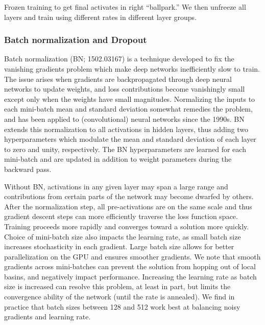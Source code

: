 \documentclass[fleqn,usenatbib]{mnras}
\begin{document}
Frozen training to get final activates in right ``ballpark.''
We then unfreeze all layers and train using different rates in different layer groups.

\subsubsection{Batch normalization and Dropout}

Batch normalization (BN; 1502.03167) is a technique developed to fix the vanishing gradients problem which make deep networks inefficiently slow to train.
The issue arises when gradients are backpropagated through deep neural networks to update weights, and loss contributions become vanishingly small except only when the weights have small magnitudes.
Normalizing the inputs to each mini-batch mean and standard deviation somewhat remedies the problem, and has been applied to (convolutional) neural networks since the 1990s.
BN extends this normalization to all activations in hidden layers, thus adding two hyperparameters which modulate the mean and standard deviation of each layer to zero and unity, respectively.
The BN hyperparameters are learned for each mini-batch and are updated in addition to weight parameters during the backward pass.

Without BN, activations in any given layer may span a large range and contributions from certain parts of the network may become dwarfed by others.
After the normalization step, all pre-activations are on the same scale and thus gradient descent steps can more efficiently traverse the loss function space.
Training proceeds more rapidly and converges toward a solution more quickly.
Choice of mini-batch size also impacts the learning rate, as small batch size increases stochasticity in each gradient.
Large batch size allows for better parallelization on the GPU and ensures smoother gradients.
We note that smooth gradients across mini-batches can prevent the solution from hopping out of local basins, and negatively impact performance.
Increasing the learning rate as batch size is increased can resolve this problem, at least in part, but limits the convergence ability of the network (until the rate is annealed).
We find in practice that batch sizes between 128 and 512 work best at balancing noisy gradients and learning rate.
\end{document}
